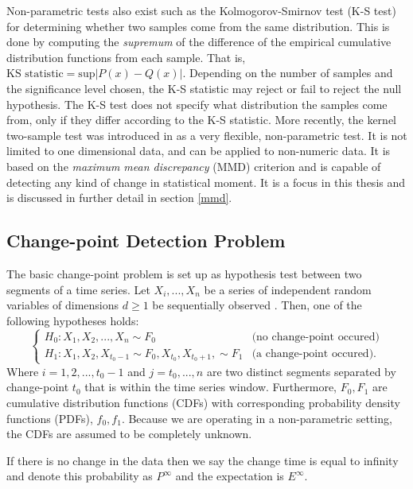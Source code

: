 Non-parametric tests also exist such as the Kolmogorov-Smirnov test (K-S test) for determining whether two samples come from the same distribution. This is done by computing the \textit{supremum} of the difference of the empirical cumulative distribution functions from each sample. That is, $\text{KS statistic} =\text{sup} |P(x) - Q(x)|$. Depending on the number of samples and the significance level chosen, the K-S statistic may reject or fail to reject the null hypothesis. The K-S test does not specify what distribution the samples come from, only if they differ according to the K-S statistic. More recently, the kernel two-sample test was introduced in \cite{gretton2012kernel} as a very flexible, non-parametric test. It is not limited to one dimensional data, and can be applied to non-numeric data. It is based on the \textit{maximum mean discrepancy} (MMD) criterion and is capable of detecting any kind of change in statistical moment. It is a focus in this thesis and is discussed in further detail in section \ref{mmd}.


\subsection{Change-point Detection Problem}
The basic change-point problem is set up as hypothesis test between two segments of a time series. Let $X_i,...,X_n$ be a series of independent random variables of dimensions $d \geq 1$ be sequentially observed . Then, one of the following hypotheses holds:
\begin{equation}
  \begin{cases}
    H_0: X_1, X_2, ...,X_n \sim  F_0 & \text{(no change-point occured)} \\
    H_1: X_1,X_2, X_{t_0-1} \sim F_0, X_{t_0}, X_{t_0+1},  \sim F_1 & \text{(a change-point occured)}. 
  \end{cases}
\end{equation}
Where $i=1,2,...,t_0-1$ and $j=t_0,...,n$  are two distinct segments separated by change-point $t_0$ that is within the time series window. Furthermore, $F_0, F_1$ are cumulative distribution functions (CDFs) with corresponding probability density functions (PDFs), $f_0, f_1$. Because we are operating in a non-parametric setting, the CDFs are assumed to be completely unknown. 

If there is no change in the data then we say the change time is equal to infinity and denote this probability as $P^{\infty}$ and the expectation is $E^{\infty}$.

